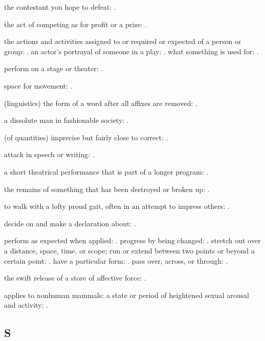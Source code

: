   the contestant you hope to defeat: .

  the act of competing as for profit or a prize: .

  the actions and activities assigned to or required or expected of a person or group: . an actor's portrayal of someone in a play: . what something is used for: .

  perform on a stage or theater: .

  space for movement: .

  (linguistics) the form of a word after all affixes are removed: .

  a dissolute man in fashionable society: .

  (of quantities) imprecise but fairly close to correct: .

  attack in speech or writing: .

  a short theatrical performance that is part of a longer program: .

  the remains of something that has been destroyed or broken up: .

  to walk with a lofty proud gait, often in an attempt to impress others: .

  decide on and make a declaration about: .

  perform as expected when applied: . progress by being changed: . stretch out over a distance, space, time, or scope; run or extend between two points or beyond a certain point: . have a particular form: . pass over, across, or through: .

  the swift release of a store of affective force: .

  applies to nonhuman mammals: a state or period of heightened sexual arousal and activity: .

\subsection*{S}

